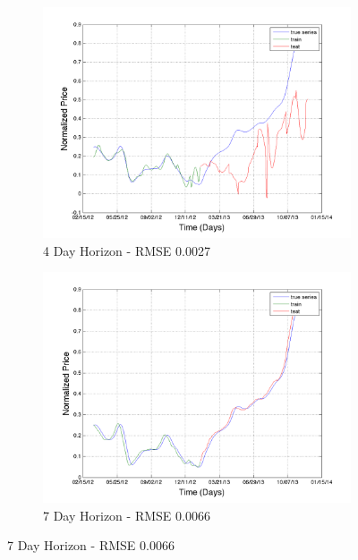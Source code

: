 \begin{figure}
        \centering
        \begin{subfigure}[b]{0.5\textwidth}
                \includegraphics[width=\textwidth]{img/model/beef/pred_4}
                \caption{4 Day Horizon - RMSE 0.0027 }
                \label{fig:gull}
        \end{subfigure}%
        \begin{subfigure}[b]{0.5\textwidth}
                \includegraphics[width=\textwidth]{img/model/beef/pred_7}
                \caption{7 Day Horizon - RMSE 0.0066}
                \label{fig:tiger}
        \end{subfigure}
       

\end{figure}
